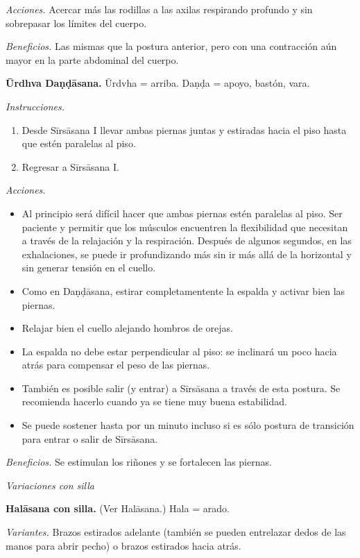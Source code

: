 \emph{Acciones.} Acercar más las rodillas a
las axilas respirando profundo y sin
sobrepasar los límites del cuerpo.

\emph{Beneficios.} Las mismas que la postura
anterior, pero con una contracción aún mayor
en la parte abdominal del cuerpo.

\medskip\noindent\textbf{Ūrdhva Daṇḍāsana.}
Ūrdvha = arriba. Daṇḍa = apoyo, bastón, vara.

\emph{Instrucciones.}
\begin{enumerate}
\item Desde Sīrsāsana I llevar ambas piernas
juntas y estiradas hacia el piso hasta que
estén paralelas al piso.
\item Regresar a Sīrsāsana I.
\end{enumerate}

\emph{Acciones.}
\begin{itemize}
\item Al principio será difícil hacer que
ambas piernas estén paralelas al piso. Ser
paciente y permitir que los músculos
encuentren la flexibilidad que necesitan a
través de la relajación y la respiración.
Después de algunos segundos, en las
exhalaciones, se puede ir profundizando más
sin ir más allá de la horizontal y sin
generar tensión en el cuello.
\item Como en Daṇḍāsana, estirar
completamentente la espalda y activar bien
las piernas.
\item Relajar bien el cuello alejando hombros
de orejas.
\item La espalda no debe estar perpendicular
al piso: se inclinará un poco hacia atrás
para compensar el peso de las piernas.
\item También es posible salir (y entrar) a
Sīrsāsana a través de esta postura. Se
recomienda hacerlo cuando ya se tiene muy
buena estabilidad.
\item Se puede sostener hasta por un minuto
incluso si es sólo postura de transición para
entrar o salir de Sīrsāsana.
\end{itemize}

\emph{Beneficios.} Se estimulan los riñones y
se fortalecen las piernas.

\medskip\noindent\emph{Variaciones con silla}

\medskip\noindent\textbf{Halāsana con silla.}
(Ver Halāsana.) Hala = arado.

\emph{Variantes.} Brazos estirados adelante
(también se pueden entrelazar dedos de las
manos para abrir pecho) o brazos estirados
hacia atrás.

